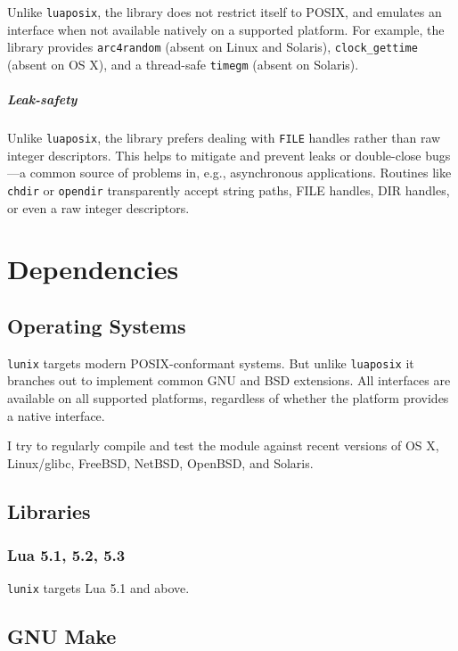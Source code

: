\documentclass[11pt, oneside]{memoir}
\newcommand*{\lunix}[0]{\texttt{lunix}\xspace}
\newcommand*{\luaposix}[0]{\texttt{luaposix}\xspace}
\newcommand*{\fn}[1]{\texttt{#1}\xspace}
\newcommand*{\const}[1]{\texttt{#1}\xspace}
\begin{document}
Unlike \luaposix, the library does not restrict itself to POSIX, and emulates an interface when not available natively on a supported platform. For example, the library provides \fn{arc4random} (absent on Linux and Solaris), \fn{clock\_gettime} (absent on OS X), and a thread-safe \fn{timegm} (absent on Solaris).

\paragraph{Leak-safety}

Unlike \luaposix, the library prefers dealing with \const{FILE} handles rather than raw integer descriptors. This helps to mitigate and prevent leaks or double-close bugs---a common source of problems in, e.g., asynchronous applications. Routines like \fn{chdir} or \fn{opendir} transparently accept string paths, FILE handles, DIR handles, or even a raw integer descriptors.

\chapter{Dependencies}

\section{Operating Systems}

\lunix targets modern POSIX-conformant systems. But unlike \texttt{luaposix} it branches out to implement common GNU and BSD extensions. All interfaces are available on all supported platforms, regardless of whether the platform provides a native interface.

I try to regularly compile and test the module against recent versions of OS X, Linux/glibc, FreeBSD, NetBSD, OpenBSD, and Solaris.

\section{Libraries}

\subsection{Lua 5.1, 5.2, 5.3}

\lunix targets Lua 5.1 and above.

\section{GNU Make}
\end{document}
